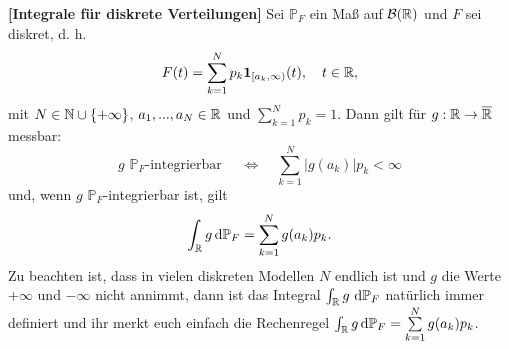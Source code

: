\begin{satz}\label{IntDiskr}
\textbf{[Integrale f\"ur diskrete Verteilungen]}
	Sei $ \mathbb{P}_F $ ein Maß auf $\mathcal{B}(\mathbb{R})$ und $F$ sei diskret, d. h.
	\[ F(t) = \sum\limits_{k = 1}^{N} p_k \mathbf{1}_{[a_k,\infty)}(t), \quad t\in\mathbb{R}, \]
	mit $N \in \mathbb{N} \cup \{ + \infty \}$, $a_1, ..., a_N \in \mathbb{R}$ und $\sum_{k = 1}^{N} p_k = 1$. Dann gilt f\"ur $g:\mathbb{R}\to\overline{\mathbb{R}}$ messbar:
	\[g\,\,\mathbb{P}_F \text{-integrierbar }\quad  \Leftrightarrow \quad \sum\limits_{k = 1}^{N} |g(a_k)|p_k<\infty \] und, wenn $g$ $\mathbb{P}_F$-integrierbar ist, gilt  \[ \int_{\mathbb{R}} g \, \mathrm{d} \mathbb{P}_F = \sum\limits_{k = 1}^{N} g(a_k)p_k . \]
	Zu beachten ist, dass in vielen diskreten Modellen $N$ endlich ist und $g$ die Werte $+\infty$ und $-\infty$ nicht annimmt, dann ist das Integral $\int_{\mathbb{R}} g\, \, \mathrm{d} \mathbb P_F$ nat\"urlich immer definiert und ihr merkt euch einfach die Rechenregel $\int_{\mathbb{R}} g \, \mathrm{d} \mathbb{P}_F = \sum\limits_{k = 1}^{N} g(a_k)p_k$.
\end{satz}



